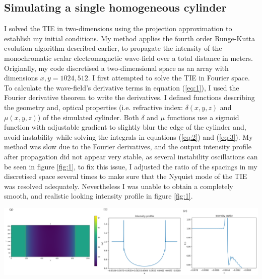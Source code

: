 \documentclass[9pt, a4paper]{article}
\newenvironment{Figure}
    {\par\medskip\noindent\minipage{\linewidth}}
    {\endminipage\par\medskip}
\begin{document}
\subsection{Simulating a single homogeneous cylinder}
I solved the TIE in two-dimensions using the projection approximation to establish my initial conditions. My method applies the fourth order Runge-Kutta evolution algorithm described earlier, to propagate the intensity of the monochromatic scalar electromagnetic wave-field over a total distance in meters. Originally, my code discretised a two-dimensional space as an array with dimensions $x, y = 1024, 512$. I first attempted to solve the TIE in Fourier space. To calculate the wave-field's derivative terms in equation (\ref{eq:1}), I used the Fourier derivative theorem to write the derivatives. I defined functions describing the geometry and, optical properties (i.e. refractive index: $\delta(x, y, z)$ and $\mu(x, y, z)$) of the simulated cylinder. Both $\delta$ and $\mu$ functions use a sigmoid function with adjustable gradient to slightly blur the edge of the cylinder and, avoid instability while solving the integrals in equations (\ref{eq:2}) and (\ref{eq:3}). My method was slow due to the Fourier derivatives, and the output intensity profile after propagation did not appear very stable, as several instability oscillations can be seen in figure \ref{fig:1}, to fix this issue, I adjusted the ratio of the spacings in my discretised space several times to make sure that the Nyquist mode of the TIE was resolved adequately. Nevertheless I was unable to obtain a completely smooth, and realistic looking intensity profile in figure \ref{fig:1}.
\begin{Figure}\label{fig:1}
\centering
\includegraphics[width=\linewidth]{Fourier_intensity_profile.pdf}
\end{Figure}
\end{document}
